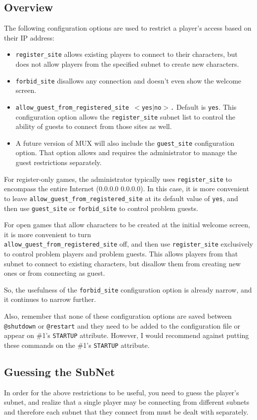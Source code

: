 \documentclass[dvips]{book}
\begin{document}
\subsection{Overview}
The following configuration options are used to restrict a player's access
based on their IP address:
\begin{itemize}
\item
\texttt{register\_site} allows existing players to connect to their
characters, but does not allow players from the specified subnet to create
new characters.
\item
\texttt{forbid\_site} disallows any connection and doesn't even show the
welcome screen.
\item
\texttt{allow\_guest\_from\_registered\_site $<$yes$|$no$>$.}  Default is
\texttt{yes}. This configuration option allows the \texttt{register\_site}
subnet list to control the ability of guests to connect from those sites as
well.
\item A future version of MUX will also include the \texttt{guest\_site}
configuration option. That option allows and requires the administrator to
manage the guest restrictions separately.
\end{itemize}
For register-only games, the administrator typically uses
\texttt{register\_site} to encompass the entire Internet (0.0.0.0 0.0.0.0).
In this case, it is more convenient to leave
\texttt{allow\_guest\_from\_registered\_site} at its default value of
\texttt{yes}, and then use \texttt{guest\_site} or \texttt{forbid\_site} to
control problem guests.

For open games that allow characters to be created at the initial welcome
screen, it is more convenient to turn\\
\texttt{allow\_guest\_from\_registered\_site} off, and then use
\texttt{register\_site} exclusively to control problem players and problem
guests. This allows players from that subnet to connect to existing
characters, but disallow them from creating new ones or from connecting as
guest.

So, the usefulness of the \texttt{forbid\_site} configuration option is
already narrow, and it continues to narrow further.

Also, remember that none of these configuration options are saved between
\texttt{@shutdown} or \texttt{@restart} and they need to be added to the
configuration file or appear on \#1's \texttt{STARTUP} attribute. However,
I would recommend against putting these commands on the \#1's \texttt{STARTUP}
attribute.
\subsection{Guessing the SubNet}
In order for the above restrictions to be useful, you need to guess the
player's subnet, and realize that a single player may be connecting from
different subnets and therefore each subnet that they connect from must be
dealt with separately.
\end{document}
